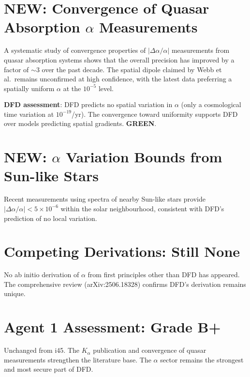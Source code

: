\documentclass[11pt,a4paper]{article}
\newcommand{\GREEN}{\textcolor{dfdgreen}{\textbf{GREEN}}}
\newcommand{\NEW}{\textcolor{dfdblue}{\textbf{NEW}}}
\begin{document}
\section{\NEW: Convergence of Quasar Absorption $\alpha$ Measurements}

\begin{tcolorbox}[colback=blue!5!white, colframe=blue!60!black,
  title={MNRAS 528, 6550 (2024): Convergence Properties of $\alpha$ Measurements from Quasars}]

A systematic study of convergence properties of $|\Delta\alpha/\alpha|$ measurements from quasar absorption systems shows that the overall precision has improved by a factor of $\sim 3$ over the past decade. The spatial dipole claimed by Webb et al.\ remains unconfirmed at high confidence, with the latest data preferring a spatially uniform $\alpha$ at the $10^{-5}$ level.

\textbf{DFD assessment}: DFD predicts no spatial variation in $\alpha$ (only a cosmological time variation at $10^{-19}$/yr). The convergence toward uniformity supports DFD over models predicting spatial gradients. \GREEN.
\end{tcolorbox}

\section{\NEW: $\alpha$ Variation Bounds from Sun-like Stars}

Recent measurements using spectra of nearby Sun-like stars provide $|\Delta\alpha/\alpha| < 5 \times 10^{-6}$ within the solar neighbourhood, consistent with DFD's prediction of no local variation.

\section{Competing Derivations: Still None}

No ab initio derivation of $\alpha$ from first principles other than DFD has appeared. The comprehensive review (arXiv:2506.18328) confirms DFD's derivation remains unique.

\section{Agent 1 Assessment: Grade B+}

Unchanged from i45. The $K_\alpha$ publication and convergence of quasar measurements strengthen the literature base. The $\alpha$ sector remains the strongest and most secure part of DFD.
\end{document}
